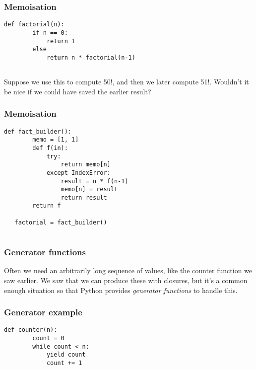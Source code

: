 \documentclass[10pt]{beamer}
\begin{document}
\begin{frame}[fragile]
  \frametitle{Memoisation}

  
\begin{Verbatim}[commandchars=\\\%\%]
    def factorial(n):
        if n == 0:
            return 1
        else
            return n * factorial(n-1)
       
\end{Verbatim}
Suppose we use this to compute 50!, and then we later 
compute 51!.  Wouldn't it be nice if we could have
saved the earlier result?
\end{frame}
\begin{frame}[fragile]
  \frametitle{Memoisation}

  
\begin{Verbatim}[commandchars=\\\%\%]
    def fact_builder():
        memo = [1, 1]
        def f(in):
            try:
                return memo[n]
            except IndexError:
                result = n * f(n-1)
                memo[n] = result
                return result
        return f

   factorial = fact_builder()
       
\end{Verbatim}

\end{frame}

\begin{frame}
	\frametitle{Generator functions}

	Often we need an arbitrarily long sequence of values, like the counter function 
	we saw earlier.  We saw that we can produce these with closures, but it's a
	common enough situation so that Python provides \emph{generator functions}
	to handle this.
\end{frame}
\begin{frame}[fragile]
  \frametitle{Generator example}

  
\begin{Verbatim}[commandchars=\\\%\%]
    def counter(n):
        count = 0
        while count < n:
            yield count
            count += 1

\end{Verbatim}
\end{frame}
\end{document}
